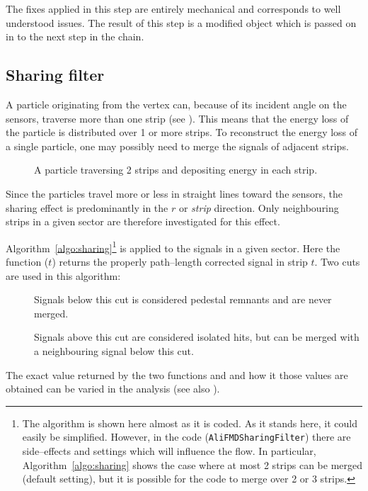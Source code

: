 The fixes applied in this step are entirely mechanical and corresponds
to well understood issues.  The result of this step is a modified
\ESD{} object which is passed on in to the next step in the chain.


\subsection{Sharing filter}
\label{sec:sub:sharing_filter}

A particle originating from the vertex can, because of its incident
angle on the \FMD{} sensors, traverse more than one strip (see
).  This means that the energy loss of the
particle is distributed over 1 or more strips.  To reconstruct the
energy loss of a single particle, one may possibly need to merge the
signals of adjacent strips.

\begin{figure}[htbp]
  \centering
  \caption{A particle traversing 2 strips and depositing energy in
    each strip. }
  \label{fig:share_fraction}
\end{figure}

\iffalse
The effect is most pronounced in low--flux\footnote{Events with a low
  hit density.} events, like proton--proton collisions or peripheral
Pb--Pb collisions, while in high--flux events the hit density is so
high that most likely each and every strip will be hit and the effect
cancels out on average.
\fi

Since the particles travel more or less in straight lines toward the
\FMD{} sensors, the sharing effect is predominantly in the $r$ or
\emph{strip} direction.  Only neighbouring strips in a given sector are
therefore investigated for this effect.  

Algorithm~\ref{algo:sharing}\footnote{The algorithm is shown here
  almost as it is coded.  As it stands here, it could easily be
  simplified.  However, in the code (\texttt{AliFMDSharingFilter})
  there are side--effects and settings which will influence the
  flow. In particular, Algorithm~\ref{algo:sharing} shows the case
  where at most 2 strips can be merged (default setting), but it is
  possible for the code to merge over 2 or 3 strips.} is applied to
the signals in a given sector. Here the function
($t$) returns the properly path--length
corrected signal in strip $t$.  Two cuts are used in this algorithm:
\begin{description}
\item[] Signals below this cut is considered
  pedestal remnants and are never merged. 
\item[] Signals above this cut are considered
  isolated hits, but can be merged with a neighbouring signal below
  this cut. 
\end{description}
The exact value returned by the two functions   and
 and how it those values are obtained can be
varied in the analysis (see also ).  


